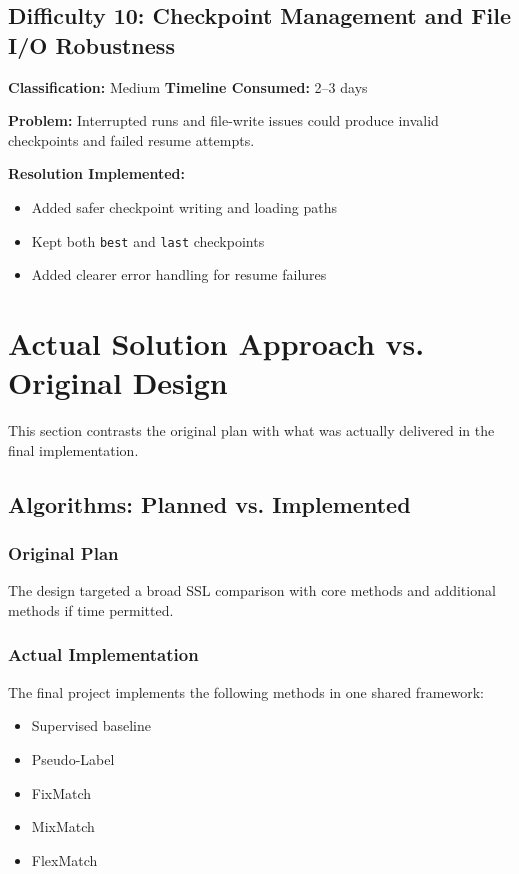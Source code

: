 \subsection{Difficulty 10: Checkpoint Management and File I/O Robustness}

\textbf{Classification:} Medium \quad \textbf{Timeline Consumed:} 2--3 days

\textbf{Problem:}
Interrupted runs and file-write issues could produce invalid checkpoints and failed resume attempts.

\textbf{Resolution Implemented:}

\begin{itemize}
    \item Added safer checkpoint writing and loading paths
    \item Kept both \texttt{best} and \texttt{last} checkpoints
    \item Added clearer error handling for resume failures
\end{itemize}

\section{Actual Solution Approach vs. Original Design}

This section contrasts the original plan with what was actually delivered in the final implementation.

\subsection{Algorithms: Planned vs. Implemented}

\subsubsection{Original Plan}

The design targeted a broad SSL comparison with core methods and additional methods if time permitted.

\subsubsection{Actual Implementation}

The final project implements the following methods in one shared framework:

\begin{itemize}
    \item Supervised baseline
    \item Pseudo-Label
    \item FixMatch
    \item MixMatch
    \item FlexMatch
\end{itemize}

